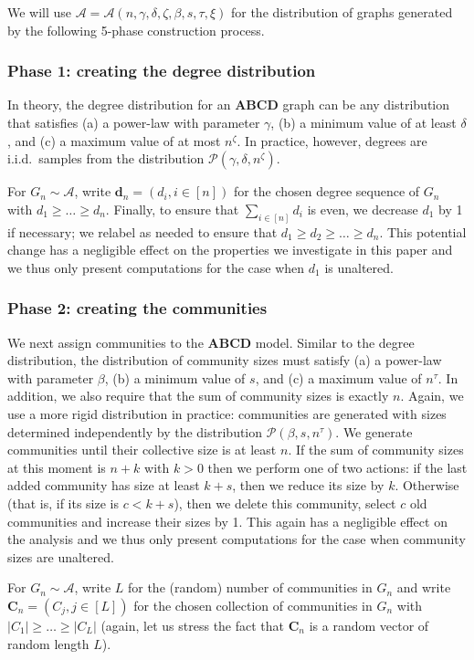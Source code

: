 \documentclass[12pt]{article}
\theoremstyle{definition}
\theoremstyle{remark}
\theoremstyle{remark}
\numberwithin{theorem}{section}
\newcommand{\abcdDist}{\ensuremath{\mathcal{A}}}
\newcommand{\abcdDistFull}{\ensuremath{\mathcal{A}(n,\gamma,\delta,\zeta,\beta,s,\tau,\xi)}}
\newcommand{\tpl}[3]{\ensuremath{\mathcal{P}\left(#1,#2,#3\right)}}
\begin{document}
We will use $\abcdDist = \abcdDistFull$ for the distribution of graphs generated by the following 5-phase construction process. 

\subsubsection*{Phase 1: creating the degree distribution}
In theory, the degree distribution for an \textbf{ABCD} graph can be any distribution that satisfies (a) a power-law with parameter $\gamma$, (b) a minimum value of at least $\delta$, and (c) a maximum value of at most $n^{\zeta}$. In practice, however, degrees are i.i.d.\ samples from the distribution $\tpl{\gamma}{\delta}{n^\zeta}$. 

For $G_n \sim \abcdDist$, write $\textbf{d}_n = (d_i, i \in [n])$ for the chosen degree sequence of $G_n$ with $d_1 \geq \dots \geq d_n$. Finally, to ensure that $\sum_{i \in [n]} d_i$ is even, we decrease $d_1$ by 1 if necessary; we relabel as needed to ensure that $d_1 \geq d_2 \geq \dots \geq d_n$. This potential change has a negligible effect on the properties we investigate in this paper and we thus only present computations for the case when $d_1$ is unaltered. 

\subsubsection*{Phase 2: creating the communities}
We next assign communities to the \textbf{ABCD} model. Similar to the degree distribution, the distribution of community sizes must satisfy (a) a power-law with parameter $\beta$, (b) a minimum value of $s$, and (c) a maximum value of $n^{\tau}$. In addition, we also require that the sum of community sizes is exactly $n$. Again, we use a more rigid distribution in practice: communities are generated with sizes determined independently by the distribution $\tpl{\beta}{s}{n^\tau}$. We generate communities until their collective size is at least $n$. If the sum of community sizes at this moment is $n + k$ with $k > 0$ then we perform one of two actions: if the last added community has size at least $k+s$, then we reduce its size by $k$. Otherwise (that is, if its size is $c < k+s$), then we delete this community, select $c$ old communities and increase their sizes by 1. This again has a negligible effect on the analysis and we thus only present computations for the case when community sizes are unaltered.

For $G_n \sim \abcdDist$, write $L$ for the (random) number of communities in $G_n$ and write $\textbf{C}_n = (C_j,j \in [L])$ for the chosen collection of communities in $G_n$ with $|C_1| \geq \dots \geq |C_L|$ (again, let us stress the fact that $\textbf{C}_n$ is a random vector of random length $L$).
\end{document}
